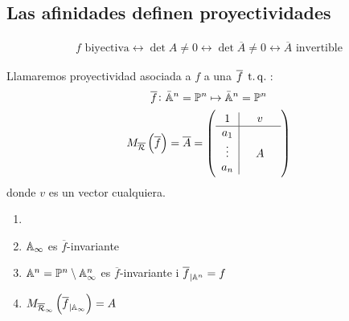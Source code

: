    \subsection{Las afinidades definen proyectividades}
    \begin{gather*}
    f\text{ biyectiva} \leftrightarrow \det A \ne 0 \leftrightarrow \det \overline{A} \ne 0 \leftrightarrow \overline{A} \text{ invertible}
    \end{gather*}
    \begin{defi}
        Llamaremos proyectividad asociada a $f$ a una $\overline{f} \operatorname{\;t.q.\;}$:
        \begin{gather*}
            \overline{f} \colon \bar{\mathbb{A}}^n = \mathbb{P}^n \mapsto \bar{\mathbb{A}}^n = \mathbb{P}^n \\
            M_{\overline{\mathcal{R}}}\left( \overline{f}\right) = \overline{A} = 
            \left(
            \begin{array}{c|ccc}
                1 &  & v & \\ \hline
                a_1 & & & \\
                \vdots & & A & \\
                a_n & & & 
            \end{array} \right) \\ 
        \end{gather*}
        donde $v$ es un vector cualquiera.
    \end{defi}
    \begin{prop}
        \begin{enumerate}
            \item[]
            \item $\mathbb{A}_\infty$ es $\overline{f}$-invariante
            \item $\mathbb{A}^n = \mathbb{P}^n \setminus \mathbb{A}_\infty^n$ es $\overline{f}$-invariante i $\overline{f}_{|\mathbb{A}^n}=f$
            \item $M_{\overline{\mathcal{R}}_\infty}\left( \overline{f}_{|\mathbb{A}_\infty} \right) = A$
        \end{enumerate}
    \end{prop}
